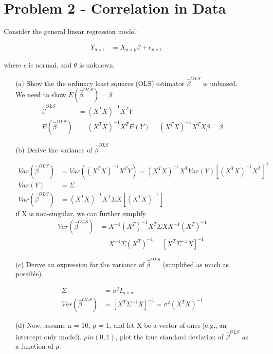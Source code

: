 \documentclass[11pt]{article} %
\begin{document}
\section{Problem 2 - Correlation in Data}
Consider the general linear regression model:

\begin{align*}
	Y_{n \times 1} &= X_{n \times p} \beta + \epsilon_{n \times 1}
\end{align*}

where $\epsilon$ is normal, and $\theta$ is unknown.

\begin{itemize}
	\item [(a)] Show the the ordinary least squares (OLS) estimator $\hat{\beta}^{OLS}$ is unbiased.
	We need to show $E(\hat{\beta}^{OLS}) = \beta$
\begin{align*}
	\hat{\beta}^{OLS} &=  (X^T X)^{-1}X^T Y \\
	E(\hat{\beta}^{OLS}) &= (X^T X)^{-1}X^T E(Y) =  (X^T X)^{-1}X^T X \beta = \beta
\end{align*}	
	
	\item[(b)] Derive the variance of $\hat{\beta}^{OLS}$ 
	
\begin{align*}
	Var(\hat{\beta}^{OLS}) &= Var((X^T X)^{-1}X^T Y )= (X^T X)^{-1}X^T Var(Y) [(X^T X)^{-1}X^T ]^T \\
	Var(Y) &= \Sigma \\
	Var(\hat{\beta}^{OLS})  & =  (X^T X)^{-1}X^T \Sigma X [(X^T X)^{-1}] 
\end{align*}		
	if X is non-singular, we can further simplify 
\begin{align*}	
	Var(\hat{\beta}^{OLS})	&= X^{-1} (X^T)^{-1} X^T \Sigma X X^{-1} (X^T)^{-1} \\
	&= X^{-1} \Sigma (X^T)^{-1} = [X^T \Sigma^{-1} X]^{-1}
\end{align*}		
	
	\item[(c)] Derive an expression for the variance of $\hat{\beta}^{OLS}$ (simplified as much as possible).
	
	\begin{align*}
	\Sigma &= \sigma^2 I_{n \times n} \\
	Var(\hat{\beta}^{OLS}) &= [X^T \Sigma^{-1} X]^{-1} = \sigma^2 (X^T X)^{-1}
\end{align*}

\item[(d)] Now, assume n = 10, p = 1, and let X be a vector of ones (e.g., an intercept only model). $\rho in (0,1)$, plot the true standard deviation of $\hat{\beta}^{OLS}$ as a function of $\rho$.


\end{itemize}
\end{document}
